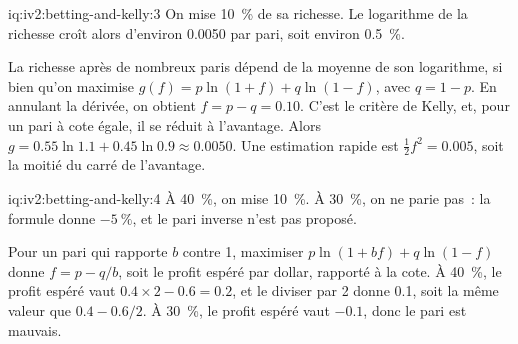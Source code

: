 \begin{solution}{iq:iv2:betting-and-kelly:3}
On mise 10~\% de sa richesse. Le logarithme de la richesse croît alors d'environ 0.0050 par pari, soit environ 0.5~\%.

La richesse après de nombreux paris dépend de la moyenne de son logarithme, si bien qu'on maximise $g(f) = p\ln(1 + f) + q\ln(1 - f)$, avec $q = 1 - p$. En annulant la dérivée, on obtient $f = p - q = 0.10$. C'est le critère de Kelly, et, pour un pari à cote égale, il se réduit à l'avantage. Alors $g = 0.55\ln 1.1 + 0.45\ln 0.9 \approx 0.0050$. Une estimation rapide est $\tfrac12 f^2 = 0.005$, soit la moitié du carré de l'avantage.

\end{solution}

\begin{solution}{iq:iv2:betting-and-kelly:4}
À 40~\%, on mise 10~\%. À 30~\%, on ne parie pas~: la formule donne $-5~\%$, et le pari inverse n'est pas proposé.

Pour un pari qui rapporte $b$ contre 1, maximiser $p\ln(1 + bf) + q\ln(1 - f)$ donne $f = p - q/b$, soit le profit espéré par dollar, rapporté à la cote. À 40~\%, le profit espéré vaut $0.4 \times 2 - 0.6 = 0.2$, et le diviser par 2 donne 0.1, soit la même valeur que $0.4 - 0.6/2$. À 30~\%, le profit espéré vaut $-0.1$, donc le pari est mauvais.

\end{solution}


